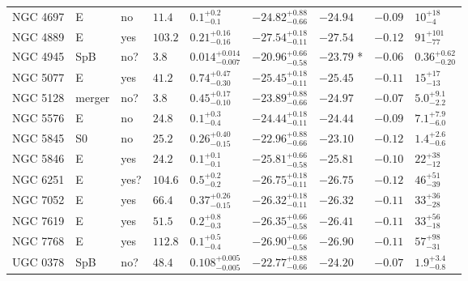 \begin{table*}
\begin{center}
\begin{tabular}{lllllllll}
NGC 4697  &  E  &  no   &  $11.4$  &  $0.1_{-0.1}^{+0.2}$   &  $-24.82_{-0.66}^{+0.88}$   &  $-24.94$   &  $-0.09$  &  $10_{-4}^{+18}$   \\ 
NGC 4889  &  E  &  yes   &  $103.2$  &  $0.21_{-0.16}^{+0.16}$   &  $-27.54_{-0.11}^{+0.18}$   &  $-27.54$   &  $-0.12$  &  $91_{-77}^{+101}$   \\ 
NGC 4945  &  SpB  &  no?  &  $3.8$  &  $0.014_{-0.007}^{+0.014}$   &  $-20.96_{-0.58}^{+0.66}$   &  $-23.79$  *  &  $-0.06$  &  $0.36_{-0.20}^{+0.62}$   \\ 
NGC 5077  &  E  &  yes   &  $41.2$  &  $0.74_{-0.30}^{+0.47}$   &  $-25.45_{-0.11}^{+0.18}$   &  $-25.45$   &  $-0.11$  &  $15_{-13}^{+17}$   \\ 
NGC 5128  &  merger  &  no?  &  $3.8$  &  $0.45_{-0.10}^{+0.17}$   &  $-23.89_{-0.66}^{+0.88}$   &  $-24.97$   &  $-0.07$  &  $5.0_{-2.2}^{+9.1}$   \\ 
NGC 5576  &  E  &  no   &  $24.8$  &  $0.1_{-0.4}^{+0.3}$   &  $-24.44_{-0.11}^{+0.18}$   &  $-24.44$   &  $-0.09$  &  $7.1_{-6.0}^{+7.9}$   \\ 
NGC 5845  &  S0  &  no   &  $25.2$  &  $0.26_{-0.15}^{+0.40}$   &  $-22.96_{-0.66}^{+0.88}$   &  $-23.10$   &  $-0.12$  &  $1.4_{-0.6}^{+2.6}$   \\ 
NGC 5846  &  E  &  yes   &  $24.2$  &  $0.1_{-0.1}^{+0.1}$   &  $-25.81_{-0.58}^{+0.66}$   &  $-25.81$   &  $-0.10$  &  $22_{-12}^{+38}$   \\ 
NGC 6251  &  E  &  yes?  &  $104.6$  &  $0.5_{-0.2}^{+0.2}$   &  $-26.75_{-0.11}^{+0.18}$   &  $-26.75$   &  $-0.12$  &  $46_{-39}^{+51}$   \\ 
NGC 7052  &  E  &  yes   &  $66.4$  &  $0.37_{-0.15}^{+0.26}$   &  $-26.32_{-0.11}^{+0.18}$   &  $-26.32$   &  $-0.11$  &  $33_{-28}^{+36}$   \\ 
NGC 7619  &  E  &  yes   &  $51.5$  &  $0.2_{-0.3}^{+0.8}$   &  $-26.35_{-0.58}^{+0.66}$   &  $-26.41$   &  $-0.11$  &  $33_{-18}^{+56}$   \\ 
NGC 7768  &  E  &  yes   &  $112.8$  &  $0.1_{-0.4}^{+0.5}$   &  $-26.90_{-0.58}^{+0.66}$   &  $-26.90$   &  $-0.11$  &  $57_{-31}^{+98}$   \\ 
UGC 0378  &  SpB  &  no?  &  $48.4$  &  $0.108_{-0.005}^{+0.005}$   &  $-22.77_{-0.66}^{+0.88}$   &  $-24.20$   &  $-0.07$  &  $1.9_{-0.8}^{+3.4}$   \\ 
\hline         
\end{tabular}   
\end{center}    
\end{table*}    
